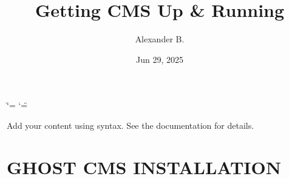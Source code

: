 \documentclass[letterpaper,10pt,english]{sphinxmanual}
\title{Getting CMS Up \& Running}
\date{Jun 29, 2025}
\author{Alexander B.\@{}}
\begin{document}
\ifdefined\shorthandoff
  \ifnum\catcode`\=\string=\active\shorthandoff{=}\fi
  \ifnum\catcode`\"=\active{}\fi
\fi

\pagestyle{empty}
\sphinxmaketitle
\pagestyle{plain}
\sphinxtableofcontents
\pagestyle{normal}
\label{\detokenize{index::doc}}


\sphinxAtStartPar
Add your content using  syntax. See the
documentation for details.

\sphinxstepscope


\chapter{GHOST CMS INSTALLATION}
\label{\detokenize{setup_backend:ghost-cms-installation}}\label{\detokenize{setup_backend::doc}}
\end{document}
